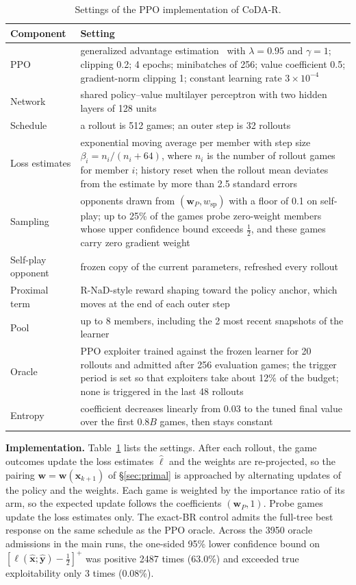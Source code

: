 \documentclass{article} %
\theoremstyle{plain}
\theoremstyle{remark}
\newcommand{\bx}{{\bm{x}}}
\newcommand{\by}{{\bm{y}}}
\newcommand{\bw}{{\bm{w}}}
\newcommand{\bell}{{\bm{\ell}}}
\newcommand{\wsp}{w_{\mathrm{sp}}}
\newcommand{\codar}{CoDA-R}
\begin{document}
\begin{table}[!htbp]
\caption{Settings of the PPO implementation of \codar{}.}
\label{tab:settings}
\begin{center}
\footnotesize
\begin{tabular}{lp{10.5cm}}
\toprule
Component & Setting \\
\midrule
PPO & generalized advantage estimation~\citep{schulman2016gae} with $\lambda=0.95$ and $\gamma=1$; clipping 0.2; 4 epochs; minibatches of 256; value coefficient 0.5; gradient-norm clipping 1; constant learning rate $3\times10^{-4}$ \\
Network & shared policy--value multilayer perceptron with two hidden layers of 128 units \\
Schedule & a rollout is 512 games; an outer step is 32 rollouts \\
Loss estimates & exponential moving average per member with step size $\beta_i=n_i/(n_i+64)$, where $n_i$ is the number of rollout games for member $i$; history reset when the rollout mean deviates from the estimate by more than 2.5 standard errors \\
Sampling & opponents drawn from $(\bw_P,\wsp)$ with a floor of 0.1 on self-play; up to 25\% of the games probe zero-weight members whose upper confidence bound exceeds $\tfrac12$, and these games carry zero gradient weight \\
Self-play opponent & frozen copy of the current parameters, refreshed every rollout \\
Proximal term & R-NaD-style reward shaping toward the policy anchor, which moves at the end of each outer step \\
Pool & up to 8 members, including the 2 most recent snapshots of the learner \\
Oracle & PPO exploiter trained against the frozen learner for 20 rollouts and admitted after 256 evaluation games; the trigger period is set so that exploiters take about 12\% of the budget; none is triggered in the last 48 rollouts \\
Entropy & coefficient decreases linearly from 0.03 to the tuned final value over the first $0.8B$ games, then stays constant \\
\bottomrule
\end{tabular}
\end{center}
\end{table}

\textbf{Implementation.} Table~\ref{tab:settings} lists the settings. After each rollout, the game outcomes update the loss estimates $\hat{\bell}$ and the weights are re-projected, so the pairing $\bw=\bw(\bx_{k+1})$ of \S\ref{sec:primal} is approached by alternating updates of the policy and the weights. Each game is weighted by the importance ratio of its arm, so the expected update follows the coefficients $(\bw_P,1)$. Probe games update the loss estimates only. The exact-BR control admits the full-tree best response on the same schedule as the PPO oracle. Across the 3950 oracle admissions in the main runs, the one-sided 95\% lower confidence bound on $[\ell(\hat\bx;\hat\by)-\tfrac12]^+$ was positive 2487 times (63.0\%) and exceeded true exploitability only 3 times (0.08\%).
\end{document}
